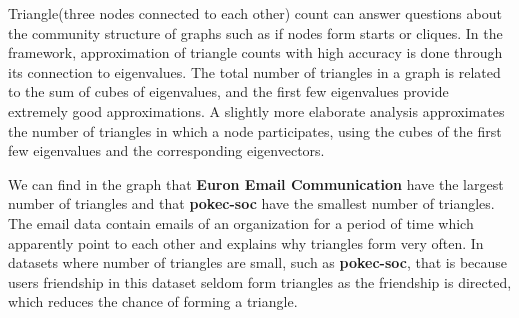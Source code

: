 Triangle(three nodes connected to each other) count can answer questions about the community structure of graphs such as if nodes form starts or cliques. In the framework, approximation of triangle counts with high accuracy is done through its connection to eigenvalues. The total number of triangles in a graph is related to the sum of cubes of eigenvalues, and the first few eigenvalues provide extremely good approximations. A slightly more elaborate analysis approximates the number of triangles in which a node participates, using the cubes of the first few eigenvalues and the corresponding eigenvectors.

We can find in the graph that \textbf{Euron Email Communication} have the largest number of triangles and that \textbf{pokec-soc} have the smallest number of triangles. The email data contain emails of an organization for a period of time which apparently point to each other and explains why triangles form very often. In datasets where number of triangles are small, such as \textbf{pokec-soc}, that is because users friendship in this dataset seldom form triangles as the friendship is directed, which reduces the chance of forming a triangle.



